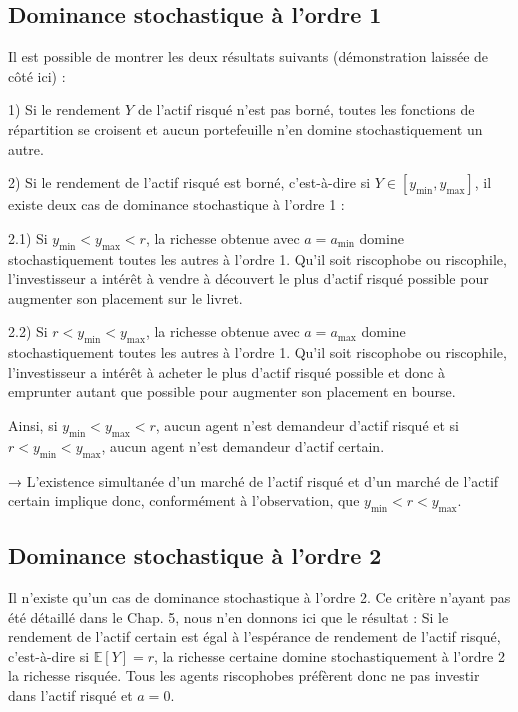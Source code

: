 \documentclass[a4paper, 12pt]{report}
\begin{document}
\subsection{Dominance stochastique à l'ordre 1}

Il est possible de montrer les deux résultats suivants (démonstration laissée de côté ici) :

1) Si le rendement \( Y \) de l'actif risqué n'est pas borné, toutes les fonctions de répartition se croisent et aucun portefeuille n'en domine stochastiquement un autre.

2) Si le rendement de l'actif risqué est borné, c'est-à-dire si \( Y \in [y_{\text{min}}, y_{\text{max}}] \), il existe deux cas de dominance stochastique à l'ordre 1 :

2.1) Si \( y_{\text{min}} < y_{\text{max}} < r \), la richesse obtenue avec \( a = a_{\text{min}} \) domine stochastiquement toutes les autres à l'ordre 1. Qu'il soit riscophobe ou riscophile, l'investisseur a intérêt à vendre à découvert le plus d'actif risqué possible pour augmenter son placement sur le livret.

2.2) Si \( r < y_{\text{min}} < y_{\text{max}} \), la richesse obtenue avec \( a = a_{\text{max}} \) domine stochastiquement toutes les autres à l'ordre 1. Qu'il soit riscophobe ou riscophile, l'investisseur a intérêt à acheter le plus d'actif risqué possible et donc à emprunter autant que possible pour augmenter son placement en bourse.

Ainsi, si \( y_{\text{min}} < y_{\text{max}} < r \), aucun agent n'est demandeur d'actif risqué et si \( r < y_{\text{min}} < y_{\text{max}} \), aucun agent n'est demandeur d'actif certain.

→ L'existence simultanée d'un marché de l'actif risqué et d'un marché de l'actif certain implique donc, conformément à l'observation, que \( y_{\text{min}} < r < y_{\text{max}} \).

\subsection{Dominance stochastique à l'ordre 2}

Il n'existe qu'un cas de dominance stochastique à l'ordre 2. Ce critère n'ayant pas été détaillé dans le Chap. 5, nous n'en donnons ici que le résultat : Si le rendement de l'actif certain est égal à l'espérance de rendement de l'actif risqué, c'est-à-dire si \( \mathbb{E}[Y] = r \), la richesse certaine domine stochastiquement à l'ordre 2 la richesse risquée. Tous les agents riscophobes préfèrent donc ne pas investir dans l'actif risqué et \( a = 0 \).
\end{document}
